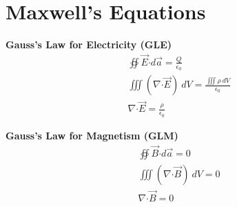 \documentclass[12pt]{article}
\newcommand*{\dotP}{\boldsymbol \cdot}		%
\begin{document}
\section{Maxwell's Equations}
\hfill \break 
\begin{minipage}[t]{0.35\textwidth}
\textbf{Gauss's Law for Electricity (GLE)}
\setlength{\jot}{2ex}
\begin{gather*}
	\boxed{ \oiint \vec{E} \dotP d\vec{a} = \frac{Q}{\epsilon_0} }\\
	\iiint (\nabla \dotP \vec{E})\ dV = \frac{\iiint \rho\ dV}{\epsilon_0} \\
	\boxed{ \nabla \dotP \vec{E} = \frac{\rho}{\epsilon_0} }
\end{gather*}
\end{minipage} 
\hspace{0.15\textwidth}
\begin{minipage}[t]{0.35\textwidth}
\textbf{Gauss's Law for Magnetism (GLM)}
\setlength{\jot}{2ex}
\begin{gather*}
	\boxed{ \oiint \vec{B} \dotP d\vec{a} = 0 }\\
	\iiint (\nabla \dotP \vec{B} )\ dV = 0 \\
	\boxed{ \nabla \dotP \vec{B} = 0 }
\end{gather*}
\end{minipage} 
\end{document}
